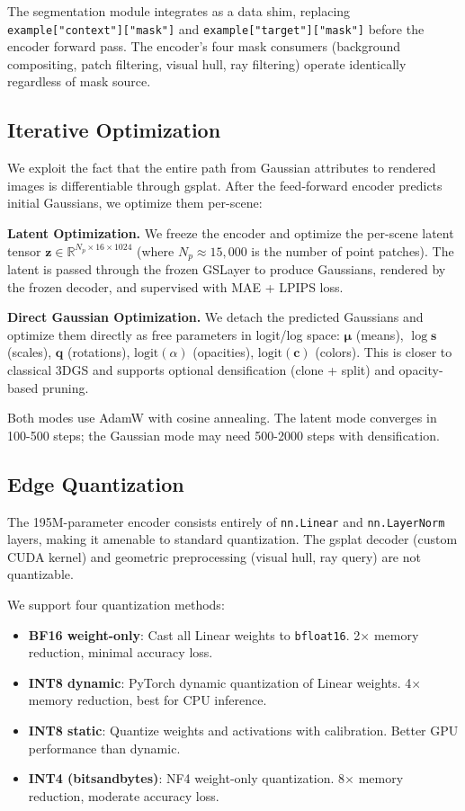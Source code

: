 \documentclass[10pt,twocolumn,letterpaper]{article}
\begin{document}
The segmentation module integrates as a data shim, replacing
\texttt{example["context"]["mask"]} and \texttt{example["target"]["mask"]}
before the encoder forward pass. The encoder's four mask consumers
(background compositing, patch filtering, visual hull, ray filtering)
operate identically regardless of mask source.

\subsection{Iterative Optimization}
\label{sec:iterative}

We exploit the fact that the entire path from Gaussian attributes to
rendered images is differentiable through gsplat. After the feed-forward
encoder predicts initial Gaussians, we optimize them per-scene:

\textbf{Latent Optimization.} We freeze the encoder and optimize the
per-scene latent tensor $\mathbf{z} \in \mathbb{R}^{N_p \times 16 \times 1024}$
(where $N_p \approx 15{,}000$ is the number of point patches). The latent
is passed through the frozen GSLayer to produce Gaussians, rendered by
the frozen decoder, and supervised with MAE + LPIPS loss.

\textbf{Direct Gaussian Optimization.} We detach the predicted Gaussians
and optimize them directly as free parameters in logit/log space:
$\boldsymbol{\mu}$ (means), $\log \mathbf{s}$ (scales), $\mathbf{q}$
(rotations), $\text{logit}(\alpha)$ (opacities), $\text{logit}(\mathbf{c})$
(colors). This is closer to classical 3DGS and supports optional
densification (clone + split) and opacity-based pruning.

Both modes use AdamW with cosine annealing. The latent mode converges in
100-500 steps; the Gaussian mode may need 500-2000 steps with densification.

\subsection{Edge Quantization}
\label{sec:quantization}

The 195M-parameter encoder consists entirely of \texttt{nn.Linear} and
\texttt{nn.LayerNorm} layers, making it amenable to standard quantization.
The gsplat decoder (custom CUDA kernel) and geometric preprocessing
(visual hull, ray query) are not quantizable.

We support four quantization methods:

\begin{itemize}[leftmargin=*]
    \item \textbf{BF16 weight-only}: Cast all Linear weights to \texttt{bfloat16}.
    2$\times$ memory reduction, minimal accuracy loss.
    \item \textbf{INT8 dynamic}: PyTorch dynamic quantization of Linear weights.
    4$\times$ memory reduction, best for CPU inference.
    \item \textbf{INT8 static}: Quantize weights and activations with calibration.
    Better GPU performance than dynamic.
    \item \textbf{INT4 (bitsandbytes)}: NF4 weight-only quantization.
    8$\times$ memory reduction, moderate accuracy loss.
\end{itemize}
\end{document}
